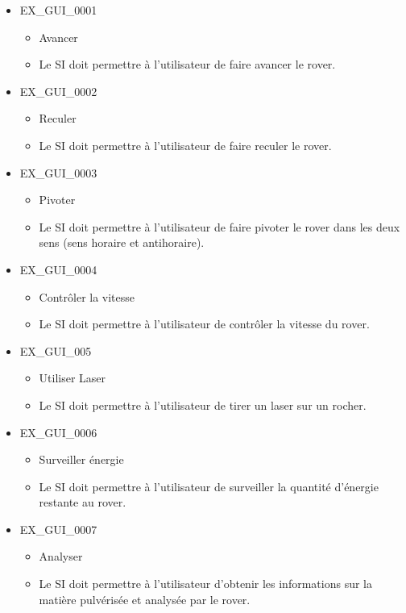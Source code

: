 \documentclass[12pt,a4paper]{scrartcl}
\begin{document}
\begin{itemize}

\item EX\_GUI\_0001
\begin{itemize}
\item Avancer
\item Le SI doit permettre à l'utilisateur de faire avancer le rover.
\end{itemize}

\item EX\_GUI\_0002
\begin{itemize}
\item Reculer
\item Le SI doit permettre à l'utilisateur de faire reculer le rover.
\end{itemize}

\item EX\_GUI\_0003
\begin{itemize}
\item Pivoter
\item Le SI doit permettre à l'utilisateur de faire pivoter le rover dans les 			deux sens (sens horaire et antihoraire).
\end{itemize}

\item EX\_GUI\_0004
\begin{itemize}
\item Contrôler la vitesse
\item Le SI doit permettre à l'utilisateur de contrôler la vitesse du rover.
\end{itemize}

\item EX\_GUI\_005
\begin{itemize}
\item Utiliser Laser
\item Le SI doit permettre à l'utilisateur de tirer un laser sur un rocher.
\end{itemize}


\item EX\_GUI\_0006
\begin{itemize}
\item Surveiller énergie
\item Le SI doit permettre à l'utilisateur de surveiller la quantité d'énergie
		restante au rover.
\end{itemize}

\item EX\_GUI\_0007
\begin{itemize}
\item Analyser
\item Le SI doit permettre à l'utilisateur d'obtenir les informations sur la
		matière pulvérisée et analysée par le rover.
\end{itemize}


\end{itemize}
\end{document}
